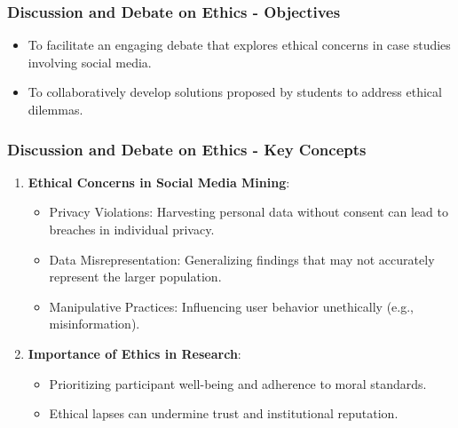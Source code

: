 \documentclass{beamer}
\begin{document}
\begin{frame}[fragile]
    \frametitle{Discussion and Debate on Ethics - Objectives}
    \begin{itemize}
        \item To facilitate an engaging debate that explores ethical concerns in case studies involving social media.
        \item To collaboratively develop solutions proposed by students to address ethical dilemmas.
    \end{itemize}
\end{frame}

\begin{frame}[fragile]
    \frametitle{Discussion and Debate on Ethics - Key Concepts}
    \begin{enumerate}
        \item \textbf{Ethical Concerns in Social Media Mining}:
        \begin{itemize}
            \item Privacy Violations: Harvesting personal data without consent can lead to breaches in individual privacy.
            \item Data Misrepresentation: Generalizing findings that may not accurately represent the larger population.
            \item Manipulative Practices: Influencing user behavior unethically (e.g., misinformation).
        \end{itemize}

        \item \textbf{Importance of Ethics in Research}:
        \begin{itemize}
            \item Prioritizing participant well-being and adherence to moral standards.
            \item Ethical lapses can undermine trust and institutional reputation.
        \end{itemize}
    \end{enumerate}
\end{frame}
\end{document}
